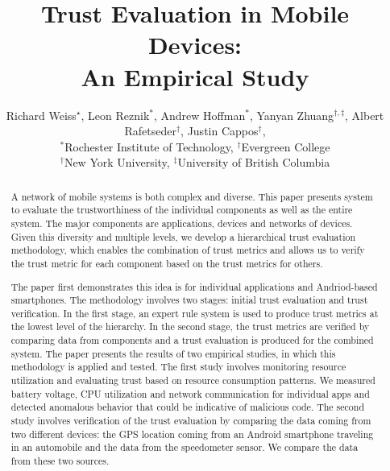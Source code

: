 \documentclass{IEEEtran}
\begin{document}
\title{Trust Evaluation in Mobile Devices: \\An Empirical Study}
\author{Richard Weiss$^{\star}$, Leon Reznik$^*$, Andrew Hoffman$^*$, Yanyan Zhuang$^{\dag, \ddag}$,
Albert Rafetseder$^{\dag}$, Justin Cappos$^{\dag}$, \\
$^*$Rochester Institute of Technology, $^{\dag}$Evergreen College\\
$^{\dag}$New York University, $^{\ddag}$University of British Columbia}

\maketitle


\begin{abstract}
A network of mobile systems is both complex and diverse.  This paper presents 
system to evaluate the trustworthiness of the individual components as well as the entire system. 
The major components are applications, devices and networks of devices.  
Given this diversity and multiple levels, we develop
a hierarchical trust evaluation methodology, which enables the combination of trust metrics 
and allows us to verify the trust metric for each component
based on the trust metrics for others.

The paper first demonstrates this idea is for individual applications and Andriod-based smartphones.
The methodology involves two stages: initial trust evaluation and trust verification.
In the first stage, an expert rule system is used to produce trust metrics at the lowest level of
the hierarchy.  In the second stage, the trust metrics are verified
by comparing data from components and a trust evaluation is produced for the 
combined system.  The paper presents the results of two empirical studies, in which 
this methodology is applied and tested. The first study involves 
monitoring resource utilization and evaluating trust based on 
resource consumption patterns. We measured battery voltage, CPU utilization and network communication
for individual apps and detected anomalous behavior that could be indicative of malicious code.
The second study involves verification of the trust evaluation by 
comparing the data coming from two different devices: the 
GPS location coming from an Android smartphone traveling in an automobile and the data from the speedometer
sensor.  We compare the data from these two sources.



\end{abstract}
\end{document}
